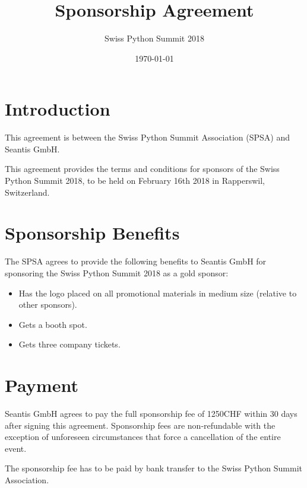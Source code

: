 \documentclass[11pt,enlargefirstpage=true,headlines=4]{scrartcl}
\title{Sponsorship Agreement}
\subtitle{Swiss Python Summit 2018}
\date{\today} %
\begin{document}
    \maketitle

    \section{Introduction}

    This agreement is between the Swiss Python Summit Association (SPSA) and
    Seantis GmbH.

    This agreement provides the terms and conditions for sponsors of the Swiss
    Python Summit 2018, to be held on February 16th 2018 in Rapperswil,
    Switzerland.

    \section{Sponsorship Benefits}

    The SPSA agrees to provide the following benefits to Seantis GmbH for sponsoring
    the Swiss Python Summit 2018 as a gold sponsor:

    \begin{itemize}
        \item Has the logo placed on all promotional materials in medium size (relative to other sponsors).
        \item Gets a booth spot.
        \item Gets three company tickets.
    \end{itemize}

    \section{Payment}

    Seantis GmbH agrees to pay the full sponsorship fee of 1250CHF within 30 days
    after signing this agreement. Sponsorship fees are non‐refundable with the
    exception of unforeseen circumstances that force a cancellation of the entire
    event.

    The sponsorship fee has to be paid by bank transfer to the Swiss Python
    Summit Association.

    \quad
\end{document}
